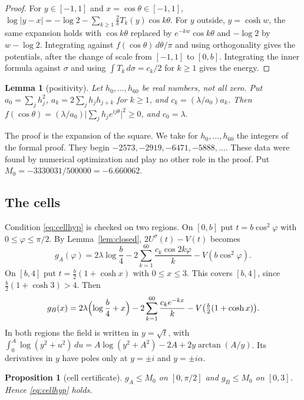 \documentclass[11pt]{amsart}
\newtheorem{lemma}[theorem]{Lemma}
\newtheorem{proposition}[theorem]{Proposition}
\theoremstyle{definition}
\theoremstyle{remark}
\numberwithin{equation}{section}
\begin{document}
\begin{proof}
For $y\in[-1,1]$ and $x=\cos\theta\in[-1,1]$, $\log|y-x|=-\log2-\sum_{k\ge1}\frac2kT_k(y)\cos k\theta$. For $y$
outside, $y=\cosh w$, the same expansion holds with $\cos k\theta$ replaced by $e^{-kw}\cos k\theta$ and $-\log2$ by
$w-\log2$. Integrating against $f(\cos\theta)\,d\theta/\pi$ and using orthogonality gives the potentials, after the
change of scale from $[-1,1]$ to $[0,b]$. Integrating the inner formula against $\sigma$ and using
$\int T_k\,d\sigma=c_k/2$ for $k\ge1$ gives the energy.
\end{proof}

\begin{lemma}[positivity]\label{lem:sos}
Let $h_0,\dots,h_{60}$ be real numbers, not all zero. Put $a_0=\sum_jh_j^2$, $a_k=2\sum_jh_jh_{j+k}$ for $k\ge1$,
and $c_k=(\lambda/a_0)a_k$. Then $f(\cos\theta)=(\lambda/a_0)\bigl|\sum_jh_je^{ij\theta}\bigr|^2\ge0$, and $c_0=\lambda$.
\end{lemma}

The proof is the expansion of the square. We take for $h_0,\dots,h_{60}$ the integers of the formal proof. They begin
$-2573,-2919,-6471,-5888,\dots$. These data were found by numerical optimization and play no other role in the proof.
Put $M_0=-3330031/500000=-6.660062$.

\subsection{The cells}
Condition \eqref{eq:cellhyp} is checked on two regions. On $[0,b]$ put $t=b\cos^2\varphi$ with
$0\le\varphi\le\pi/2$. By Lemma~\ref{lem:closed}, $2U^\sigma(t)-V(t)$ becomes
\[
 g_A(\varphi)=2\lambda\log\frac b4-2\sum_{k=1}^{60}\frac{c_k\cos2k\varphi}k-V(b\cos^2\varphi).
\]
On $[b,4]$ put $t=\frac b2(1+\cosh x)$ with $0\le x\le3$. This covers $[b,4]$, since $\frac b2(1+\cosh3)>4$. Then
\[
 g_B(x)=2\lambda\Bigl(\log\frac b4+x\Bigr)-2\sum_{k=1}^{60}\frac{c_ke^{-kx}}k-V\bigl(\tfrac b2(1+\cosh x)\bigr).
\]
In both regions the field is written in $y=\sqrt t$, with
$\int_0^A\log(y^2+u^2)\,du=A\log(y^2+A^2)-2A+2y\arctan(A/y)$. Its derivatives in $y$ have poles only at $y=\pm i$ and
$y=\pm i\alpha$.

\begin{proposition}[cell certificate]\label{prop:cells}
$g_A\le M_0$ on $[0,\pi/2]$ and $g_B\le M_0$ on $[0,3]$. Hence \eqref{eq:cellhyp} holds.
\end{proposition}
\end{document}
